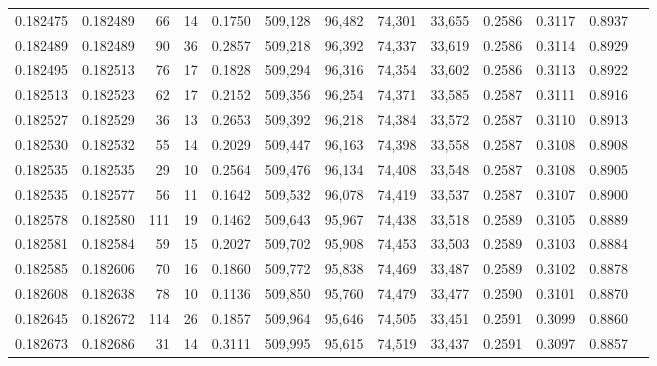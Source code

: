 \begin{tabular}{rrrrrrrrrrrrr}
0.182475 & 0.182489 &    66 &  14 &                                     0.1750 & 509,128 &  96,482 &  74,301 &  33,655 & 0.2586 & 0.3117 & 0.8937 \\
0.182489 & 0.182489 &    90 &  36 &                                     0.2857 & 509,218 &  96,392 &  74,337 &  33,619 & 0.2586 & 0.3114 & 0.8929 \\
0.182495 & 0.182513 &    76 &  17 &                                     0.1828 & 509,294 &  96,316 &  74,354 &  33,602 & 0.2586 & 0.3113 & 0.8922 \\
0.182513 & 0.182523 &    62 &  17 &                                     0.2152 & 509,356 &  96,254 &  74,371 &  33,585 & 0.2587 & 0.3111 & 0.8916 \\
0.182527 & 0.182529 &    36 &  13 &                                     0.2653 & 509,392 &  96,218 &  74,384 &  33,572 & 0.2587 & 0.3110 & 0.8913 \\
0.182530 & 0.182532 &    55 &  14 &                                     0.2029 & 509,447 &  96,163 &  74,398 &  33,558 & 0.2587 & 0.3108 & 0.8908 \\
0.182535 & 0.182535 &    29 &  10 &                                     0.2564 & 509,476 &  96,134 &  74,408 &  33,548 & 0.2587 & 0.3108 & 0.8905 \\
0.182535 & 0.182577 &    56 &  11 &                                     0.1642 & 509,532 &  96,078 &  74,419 &  33,537 & 0.2587 & 0.3107 & 0.8900 \\
0.182578 & 0.182580 &   111 &  19 &                                     0.1462 & 509,643 &  95,967 &  74,438 &  33,518 & 0.2589 & 0.3105 & 0.8889 \\
0.182581 & 0.182584 &    59 &  15 &                                     0.2027 & 509,702 &  95,908 &  74,453 &  33,503 & 0.2589 & 0.3103 & 0.8884 \\
0.182585 & 0.182606 &    70 &  16 &                                     0.1860 & 509,772 &  95,838 &  74,469 &  33,487 & 0.2589 & 0.3102 & 0.8878 \\
0.182608 & 0.182638 &    78 &  10 &                                     0.1136 & 509,850 &  95,760 &  74,479 &  33,477 & 0.2590 & 0.3101 & 0.8870 \\
0.182645 & 0.182672 &   114 &  26 &                                     0.1857 & 509,964 &  95,646 &  74,505 &  33,451 & 0.2591 & 0.3099 & 0.8860 \\
0.182673 & 0.182686 &    31 &  14 &                                     0.3111 & 509,995 &  95,615 &  74,519 &  33,437 & 0.2591 & 0.3097 & 0.8857 \\

\end{tabular}
